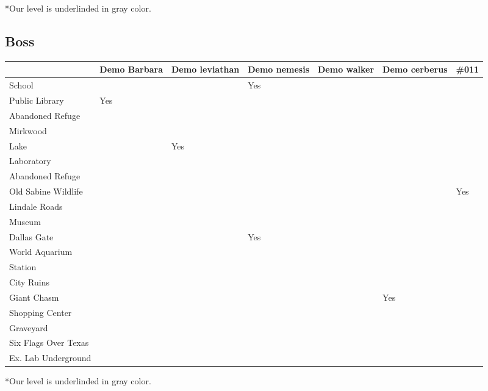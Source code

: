 \vspace*{0.2cm}

*Our level is underlinded in gray color.

\newpage

\subsection{Boss}

\vspace*{0.2cm}

\begin{center}
	\begin{tabular}[c]{| p{2.4cm} | p{1.5cm} | p{1.5cm} | p{1.5cm} | p{1.5cm} | p{1.5cm} | p{1.5cm} |}
		\hline
		& Demo Barbara & Demo leviathan & Demo nemesis & Demo walker & Demo cerberus & \#011 \\
		\hline
		School & & & Yes & & & \\
		\hline
		Public Library & Yes & & & & & \\
		\hline
		Abandoned Refuge & & & & & & \\
		\hline
		Mirkwood & & & & & & \\
		\hline
		Lake & & Yes & & & & \\
		\hline
		Laboratory & & & & & & \\
		\hline
		Abandoned Refuge & & & & & & \\
		\hline
		Old Sabine Wildlife & & & & & & Yes \\
		\hline
		Lindale Roads & & & & & & \\
		\hline
		Museum & & & & & & \\
		\hline
		Dallas Gate & & & Yes & & & \\
		\hline
		World Aquarium & & & & & & \\
		\hline
		Station & & & & & & \\
		\hline
		City Ruins & & & & & & \\
		\hline \rowcolor{light-light-gray}
		Giant Chasm & & & & & Yes & \\
		\hline
		Shopping Center & & & & & & \\
		\hline
		Graveyard & & & & & & \\
		\hline
		Six Flags Over Texas & & & & & & \\
		\hline
		Ex. Lab Underground & & & & & & \\
		\hline
	\end{tabular}
\end{center}

\vspace*{0.2cm}

*Our level is underlinded in gray color.
